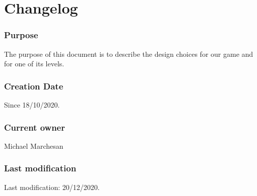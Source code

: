 \section{Changelog}

\subsubsection*{Purpose}
The purpose of this document is to describe the design choices for our game and for one of its levels.

\subsubsection*{Creation Date}
Since 18/10/2020.\\

\subsubsection*{Current owner}
Michael Marchesan

\subsubsection*{Last modification}
Last modification: 20/12/2020.

